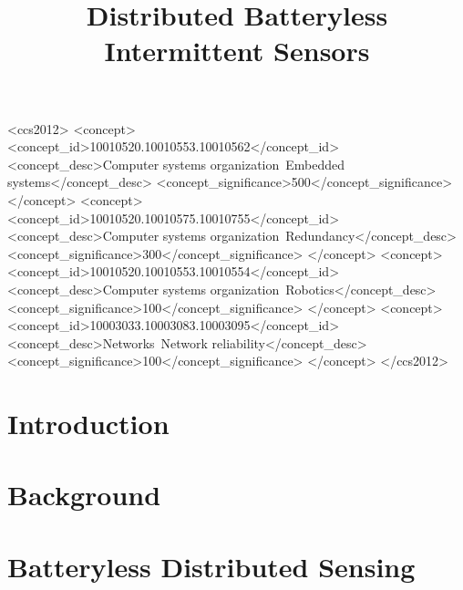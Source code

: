 \documentclass[sigconf]{acmart}
\newcommand{\fullsys}{Distributed Batteryless Intermittent Sensors}
\begin{document}
\title{\fullsys} 




\begin{abstract}

\end{abstract}
%
%
\begin{CCSXML}
<ccs2012>
 <concept>
  <concept_id>10010520.10010553.10010562</concept_id>
  <concept_desc>Computer systems organization~Embedded systems</concept_desc>
  <concept_significance>500</concept_significance>
 </concept>
 <concept>
  <concept_id>10010520.10010575.10010755</concept_id>
  <concept_desc>Computer systems organization~Redundancy</concept_desc>
  <concept_significance>300</concept_significance>
 </concept>
 <concept>
  <concept_id>10010520.10010553.10010554</concept_id>
  <concept_desc>Computer systems organization~Robotics</concept_desc>
  <concept_significance>100</concept_significance>
 </concept>
 <concept>
  <concept_id>10003033.10003083.10003095</concept_id>
  <concept_desc>Networks~Network reliability</concept_desc>
  <concept_significance>100</concept_significance>
 </concept>
</ccs2012>
\end{CCSXML}



\maketitle


\section{Introduction}
\label{sec:introduction}


\section{Background}
\label{sec:background}


\section{Batteryless Distributed Sensing}
\label{sec:disSensing}

\end{document}
